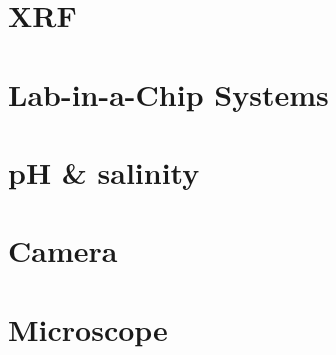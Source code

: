 

\section{XRF}

\section{Lab-in-a-Chip Systems}


\section{pH \& salinity}

\section{Camera}

\section{Microscope}
